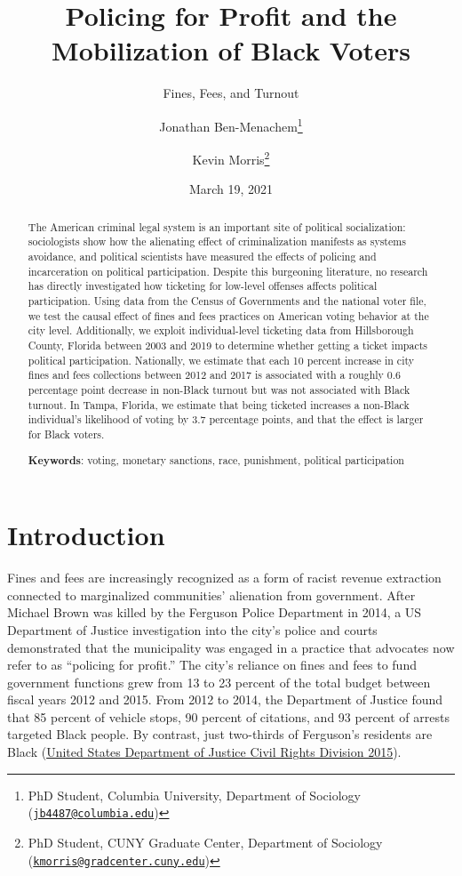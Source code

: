 \documentclass[
  12pt,
]{article}
\title{Policing for Profit and the Mobilization of Black Voters}
\subtitle{Fines, Fees, and Turnout}
\author{Jonathan Ben-Menachem\footnote{PhD Student, Columbia University, Department of Sociology (\href{mailto:jb4487@columbia.edu}{\nolinkurl{jb4487@columbia.edu}})} \and Kevin Morris\footnote{PhD Student, CUNY Graduate Center, Department of Sociology (\href{mailto:kmorris@gradcenter.cuny.edu}{\nolinkurl{kmorris@gradcenter.cuny.edu}})}}
\date{March 19, 2021}
\begin{document}
\maketitle
\begin{abstract}
The American criminal legal system is an important site of political socialization: sociologists show how the alienating effect of criminalization manifests as systems avoidance, and political scientists have measured the effects of policing and incarceration on political participation. Despite this burgeoning literature, no research has directly investigated how ticketing for low-level offenses affects political participation. Using data from the Census of Governments and the national voter file, we test the causal effect of fines and fees practices on American voting behavior at the city level. Additionally, we exploit individual-level ticketing data from Hillsborough County, Florida between 2003 and 2019 to determine whether getting a ticket impacts political participation. Nationally, we estimate that each 10 percent increase in city fines and fees collections between 2012 and 2017 is associated with a roughly 0.6 percentage point decrease in non-Black turnout but was not associated with Black turnout. In Tampa, Florida, we estimate that being ticketed increases a non-Black individual's likelihood of voting by 3.7 percentage points, and that the effect is larger for Black voters.

\hfill\break

\textbf{Keywords}: voting, monetary sanctions, race, punishment, political participation
\end{abstract}

\pagebreak

\doublespacing

\hypertarget{introduction}{%
\section*{Introduction}\label{introduction}}

Fines and fees are increasingly recognized as a form of racist revenue extraction connected to marginalized communities' alienation from government. After Michael Brown was killed by the Ferguson Police Department in 2014, a US Department of Justice investigation into the city's police and courts demonstrated that the municipality was engaged in a practice that advocates now refer to as ``policing for profit.'' The city's reliance on fines and fees to fund government functions grew from 13 to 23 percent of the total budget between fiscal years 2012 and 2015. From 2012 to 2014, the Department of Justice found that 85 percent of vehicle stops, 90 percent of citations, and 93 percent of arrests targeted Black people. By contrast, just two-thirds of Ferguson's residents are Black (\protect\hyperlink{ref-UnitedStatesDepartmentofJusticeCivilRightsDivision2015}{United States Department of Justice Civil Rights Division 2015}).
\end{document}
